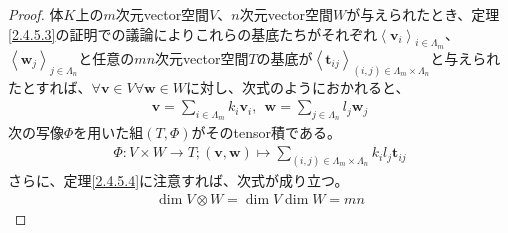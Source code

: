 \documentclass[dvipdfmx]{jsarticle}
\begin{document}
\begin{proof}
体$K$上の$m$次元vector空間$V$、$n$次元vector空間$W$が与えられたとき、定理\ref{2.4.5.3}の証明での議論によりこれらの基底たちがそれぞれ$\left\langle \mathbf{v}_{i} \right\rangle_{i \in \varLambda_{m}}$、$\left\langle \mathbf{w}_{j} \right\rangle_{j \in \varLambda_{n}}$と任意の$mn$次元vector空間$T$の基底が$\left\langle \mathbf{t}_{ij} \right\rangle_{(i,j) \in \varLambda_{m} \times \varLambda_{n}}$と与えられたとすれば、$\forall\mathbf{v} \in V\forall\mathbf{w} \in W$に対し、次式のようにおかれると、
\begin{align*}
\mathbf{v} = \sum_{i \in \varLambda_{m}} {k_{i}\mathbf{v}_{i}},\ \ \mathbf{w} = \sum_{j \in \varLambda_{n}} {l_{j}\mathbf{w}_{j}}
\end{align*}
次の写像$\varPhi$を用いた組$(T,\varPhi)$がそのtensor積である。
\begin{align*}
\varPhi:V \times W \rightarrow T;\left( \mathbf{v},\mathbf{w} \right) \mapsto \sum_{(i,j) \in \varLambda_{m} \times \varLambda_{n}} {k_{i}l_{j}\mathbf{t}_{ij}}
\end{align*}
さらに、定理\ref{2.4.5.4}に注意すれば、次式が成り立つ。
\begin{align*}
\dim{V \otimes W} = \dim V\dim W = mn
\end{align*}
\end{proof}
\end{document}
